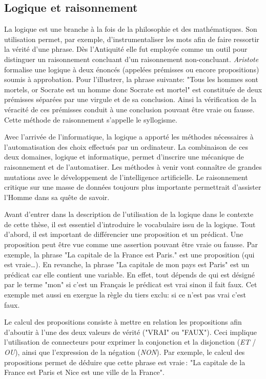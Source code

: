 \begin{refsegment}
    \subsection{Logique et raisonnement}
    
    La logique est une branche à la fois de la philosophie et des mathématiques. Son utilisation permet, par exemple, d'instrumentaliser les mots afin de faire ressortir la vérité d'une phrase. Dès l'Antiquité elle fut employée comme un outil pour distinguer un raisonnement concluant d'un raisonnement non-concluant. \textit{Aristote} formalise une logique à deux énoncés (appelées prémisses ou encore propositions) soumis à approbation. Pour l'illustrer, la phrase suivante: "Tous les hommes sont mortels, or Socrate est un homme donc Socrate est mortel" est constituée de deux prémisses séparées par une virgule et de sa conclusion. Ainsi la vérification de la véracité de ces prémisses conduit à une conclusion pouvant être vraie ou fausse. Cette méthode de raisonnement s'appelle le syllogisme.
    
    Avec l'arrivée de l'informatique, la logique a apporté les méthodes nécessaires à l'automatisation des choix effectués par un ordinateur. La combinaison de ces deux domaines, logique et informatique, permet d'inscrire une mécanique de raisonnement et de l'automatiser. Les méthodes à venir vont connaître de grandes mutations avec le développement de l'intelligence artificielle. Le raisonnement critique sur une masse de données toujours plus importante permettrait d'assister l'Homme dans sa quête de savoir.
    
    
    Avant d’entrer dans la description de l’utilisation de la logique dans le contexte de cette thèse, il est essentiel d'introduire le vocabulaire issu de la logique. Tout d'abord, il est important de différencier une proposition et un prédicat.  Une proposition peut être vue comme une assertion pouvant être vraie ou fausse. Par exemple, la phrase "La capitale de la France est Paris." est une proposition (qui est vraie\ldots). En revanche, la phrase "La capitale de mon pays est Paris" est un prédicat car elle contient une variable. En effet, tout dépends de qui est désigné par le terme "mon" si c'est un Français le prédicat est vrai sinon il fait faux. Cet exemple met aussi en exergue la règle du tiers exclu: si ce n'est pas vrai c'est faux.
    
    Le calcul des propositions consiste à mettre en relation les propositions afin d'aboutir à l'une des deux valeurs de vérité ("VRAI" ou "FAUX"). Ceci implique l'utilisation de connecteurs pour exprimer la conjonction et la disjonction (\textit{ET} / \textit{OU}), ainsi que l'expression de la négation (\textit{NON}). Par exemple, le calcul des propositions permet de déduire que cette phrase est vraie : "La capitale de la France est Paris et Nice est une ville de la France".
    

\end{refsegment}
